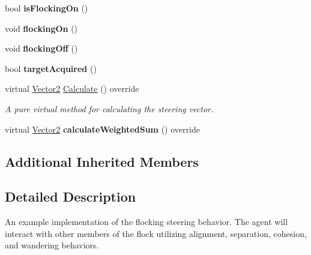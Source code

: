 \begin{DoxyCompactItemize}
\item 
\hypertarget{classsteer_1_1_flocking_component_a052f6b2e7181d69c61595c323d7eaa82}{bool {\bfseries is\-Flocking\-On} ()}\label{classsteer_1_1_flocking_component_a052f6b2e7181d69c61595c323d7eaa82}

\item 
\hypertarget{classsteer_1_1_flocking_component_a8f4122bf63050bb2beba5928b52ffceb}{void {\bfseries flocking\-On} ()}\label{classsteer_1_1_flocking_component_a8f4122bf63050bb2beba5928b52ffceb}

\item 
\hypertarget{classsteer_1_1_flocking_component_a88c5ad1cc6be0a0e196a6c9389c1171a}{void {\bfseries flocking\-Off} ()}\label{classsteer_1_1_flocking_component_a88c5ad1cc6be0a0e196a6c9389c1171a}

\item 
\hypertarget{classsteer_1_1_flocking_component_a898c7612d4be3123b547be3aa7759839}{bool {\bfseries target\-Acquired} ()}\label{classsteer_1_1_flocking_component_a898c7612d4be3123b547be3aa7759839}

\item 
\hypertarget{classsteer_1_1_flocking_component_aeb8123ba28d8d4a9df97c4f8b3f9b6c3}{virtual \hyperlink{structsteer_1_1_vector2}{Vector2} \hyperlink{classsteer_1_1_flocking_component_aeb8123ba28d8d4a9df97c4f8b3f9b6c3}{Calculate} () override}\label{classsteer_1_1_flocking_component_aeb8123ba28d8d4a9df97c4f8b3f9b6c3}

\begin{DoxyCompactList}\small\item\em A pure virtual method for calculating the steering vector. \end{DoxyCompactList}\item 
\hypertarget{classsteer_1_1_flocking_component_ae99047e5022fd6a9f03f77af94a956a9}{virtual \hyperlink{structsteer_1_1_vector2}{Vector2} {\bfseries calculate\-Weighted\-Sum} () override}\label{classsteer_1_1_flocking_component_ae99047e5022fd6a9f03f77af94a956a9}

\end{DoxyCompactItemize}
\subsection*{Additional Inherited Members}


\subsection{Detailed Description}
An example implementation of the flocking steering behavior. The agent will interact with other members of the flock utilizing alignment, separation, cohesion, and wandering behaviors. 

